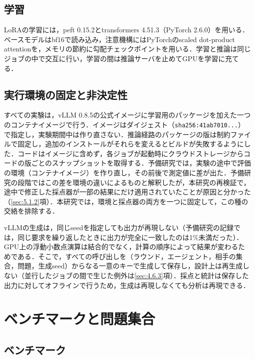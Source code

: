 \subsection{学習}
\label{sec:4.1.2}

LoRAの学習には，peft 0.15.2とtransformers 4.51.3（PyTorch 2.6.0）を用いる．ベースモデルはbf16で読み込み，注意機構にはPyTorchのscaled dot-product attentionを，メモリの節約に勾配チェックポイントを用いる．学習と推論は同じジョブの中で交互に行い，学習の間は推論サーバを止めてGPUを学習に充てる．

\subsection{実行環境の固定と非決定性}
\label{sec:4.1.3}

すべての実験は，vLLM 0.8.5の公式イメージに学習用のパッケージを加えた一つのコンテナイメージで行う．イメージはダイジェスト（\texttt{sha256:41ab7010...}）で指定し，実験期間中は作り直さない．推論経路のパッケージの版は制約ファイルで固定し，追加のインストールがそれらを変えるとビルドが失敗するようにした．コードはイメージに含めず，各ジョブが起動時にクラウドストレージからコードの版ごとのスナップショットを取得する．予備研究では，実験の途中で評価の環境（コンテナイメージ）を作り直し，その前後で測定値に差が出た．予備研究の段階ではこの差を環境の違いによるものと解釈したが，本研究の再検証で，途中で修正した採点器が一部の結果にだけ適用されていたことが原因と分かった（\ref{sec:5.1.2}項）．本研究では，環境と採点器の両方を一つに固定して，この種の交絡を排除する．

vLLMの生成は，同じseedを指定しても出力が再現しない（予備研究の記録では，同じ要求を繰り返したときに出力が完全に一致したのは1\%未満だった）．GPU上の浮動小数点演算は結合的でなく，計算の順序によって結果が変わるためである\cite{cooper2026nondeterminism}．そこで，すべての呼び出しを（ラウンド，エージェント，相手の集合，問題，生成seed）からなる一意のキーで生成して保存し，設計上は再生成しない（並行したジョブの間で生じた例外は\ref{sec:4.6.3}項）．採点と統計は保存した出力に対してオフラインで行うため，生成は再現しなくても分析は再現できる．

\section{ベンチマークと問題集合}
\label{sec:4.2}

\subsection{ベンチマーク}
\label{sec:4.2.1}

